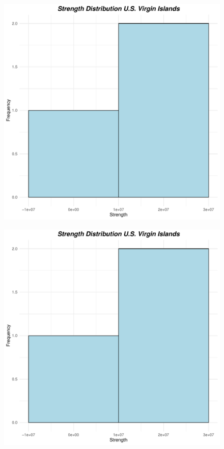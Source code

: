 \begin{figure}[h]
\begin{minipage}[t]{0.4\linewidth}
\centering
\includegraphics[width=\textwidth, page=45]{images/task43/strenght_plots.pdf} 
    \label{Texas:strength}
\end{minipage}
\hfill
\begin{minipage}[t]{0.4\linewidth}
\includegraphics[width=\textwidth, page=48]{images/task43/strenght_plots.pdf} 
    \label{Virginia:strength}
\end{minipage}



\end{figure}
